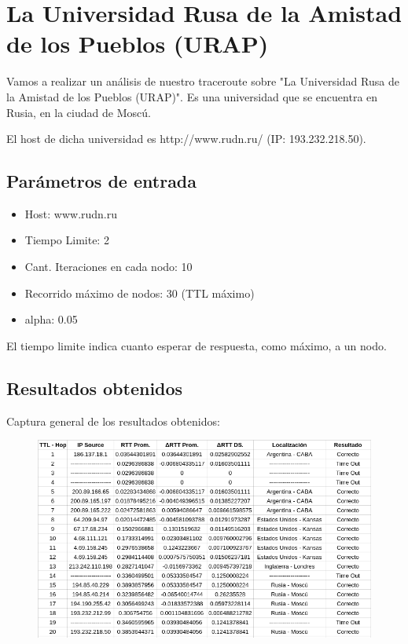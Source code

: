 \section{La Universidad Rusa de la Amistad de los Pueblos (URAP)}
Vamos a realizar un an\'alisis de nuestro traceroute sobre "La Universidad Rusa de la Amistad de los Pueblos (URAP)". Es una universidad que se encuentra en Rusia, en la ciudad de Mosc\'u.\newline

El host de dicha universidad es http://www.rudn.ru/ (IP: 193.232.218.50).\\	

\subsection{Par\'ametros de entrada}
\begin{itemize}
\item Host: www.rudn.ru
\item Tiempo Limite: 2
\item Cant. Iteraciones en cada nodo: 10
\item Recorrido m\'aximo de nodos: 30 (TTL m\'aximo)
\item alpha: 0.05
\end{itemize}
El tiempo limite indica cuanto esperar de respuesta, como m\'aximo, a un nodo.\newline

\subsection{Resultados obtenidos}

Captura general de los resultados obtenidos:

\begin{figure}[h]
    \includegraphics[width=1\textwidth]{img_analisis1/tabla.png}
    
\end{figure}
\vspace{0.25cm}


